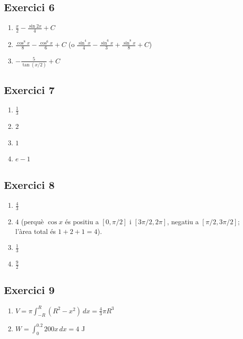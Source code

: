 \documentclass[12pt]{article}
\begin{document}
\subsection*{Exercici 6}
\begin{enumerate}[label=\alph*)]
    \item $\frac{x}{2}-\frac{\sin 2x}{4}+C$
    \item $\frac{\cos^8 x}{8}-\frac{\cos^6 x}{6}+C$ (o $\frac{\sin^4 x}{4}-\frac{\sin^6 x}{3}+\frac{\sin^8 x}{8}+C$)
    \item $-\frac{5}{\tan(x/2)}+C$
\end{enumerate}

\subsection*{Exercici 7}
\begin{enumerate}[label=\alph*)]
    \item $\frac{1}{3}$
    \item $2$
    \item $1$
    \item $e-1$
\end{enumerate}

\subsection*{Exercici 8}
\begin{enumerate}[label=\alph*)]
    \item $\frac{4}{3}$
    \item $4$ (perquè $\cos x$ és positiu a $[0,\pi/2]$ i $[3\pi/2,2\pi]$, negatiu a $[\pi/2,3\pi/2]$; l'àrea total és $1+2+1=4$).
    \item $\frac{1}{3}$
    \item $\frac{9}{2}$
\end{enumerate}

\subsection*{Exercici 9}
\begin{enumerate}[label=\alph*)]
    \item $V=\pi\int_{-R}^{R}(R^2-x^2)\,dx=\frac{4}{3}\pi R^3$
    \item $W=\int_0^{0.2}200x\,dx=4$ J
\end{enumerate}



\newpage
\end{document}
